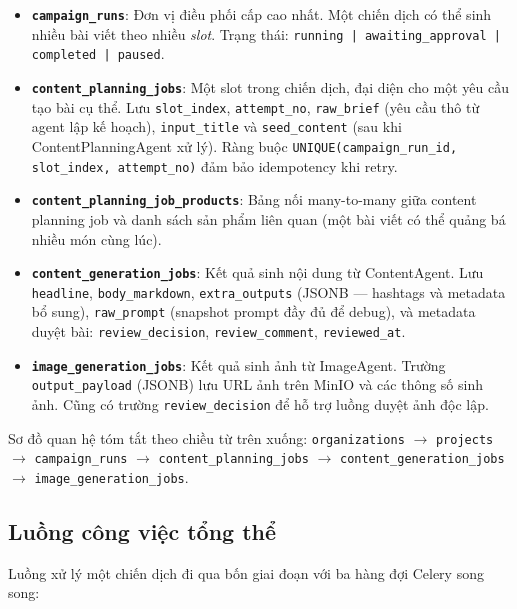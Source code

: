 \begin{itemize}
  \item \textbf{\texttt{campaign\_runs}}: Đơn vị điều phối cấp cao nhất.
    Một chiến dịch có thể sinh nhiều bài viết theo nhiều
    \emph{slot}. Trạng thái: \texttt{running | awaiting\_approval |
    completed | paused}.
  \item \textbf{\texttt{content\_planning\_jobs}}: Một slot trong chiến
    dịch, đại diện cho một yêu cầu tạo bài cụ thể. Lưu
    \texttt{slot\_index}, \texttt{attempt\_no}, \texttt{raw\_brief}
    (yêu cầu thô từ agent lập kế hoạch), \texttt{input\_title} và
    \texttt{seed\_content} (sau khi ContentPlanningAgent xử lý). Ràng
    buộc \texttt{UNIQUE(campaign\_run\_id, slot\_index, attempt\_no)}
    đảm bảo idempotency khi retry.
  \item \textbf{\texttt{content\_planning\_job\_products}}: Bảng nối
    many-to-many giữa content planning job và danh sách sản phẩm liên
    quan (một bài viết có thể quảng bá nhiều món cùng lúc).
  \item \textbf{\texttt{content\_generation\_jobs}}: Kết quả sinh nội
    dung từ ContentAgent. Lưu \texttt{headline}, \texttt{body\_markdown},
    \texttt{extra\_outputs} (JSONB --- hashtags và metadata bổ sung),
    \texttt{raw\_prompt} (snapshot prompt đầy đủ để debug), và metadata
    duyệt bài: \texttt{review\_decision}, \texttt{review\_comment},
    \texttt{reviewed\_at}.
  \item \textbf{\texttt{image\_generation\_jobs}}: Kết quả sinh ảnh từ
    ImageAgent. Trường \texttt{output\_payload} (JSONB) lưu URL ảnh
    trên MinIO và các thông số sinh ảnh. Cũng có trường
    \texttt{review\_decision} để hỗ trợ luồng duyệt ảnh độc lập.
\end{itemize}

Sơ đồ quan hệ tóm tắt theo chiều từ trên xuống:
\texttt{organizations} $\to$ \texttt{projects} $\to$
\texttt{campaign\_runs} $\to$ \texttt{content\_planning\_jobs} $\to$
\texttt{content\_generation\_jobs} $\to$
\texttt{image\_generation\_jobs}.

\subsection{Luồng công việc tổng thể}

Luồng xử lý một chiến dịch đi qua bốn giai đoạn với ba hàng đợi Celery
song song:

